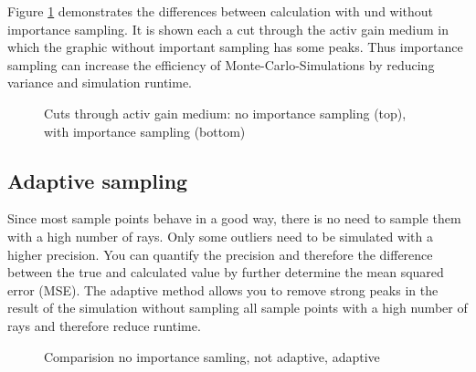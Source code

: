 Figure \ref{graphic:importance} demonstrates
the differences between calculation with und without
importance sampling. It is shown each a cut through the activ 
gain medium in which the graphic without important
sampling has some peaks. Thus importance 
sampling can increase the efficiency of Monte-Carlo-Simulations 
by reducing variance and simulation runtime. 
\begin{figure}
  \centerline
  {}
  \caption{Cuts through activ gain medium: no importance sampling (top), with importance sampling (bottom)}
  \label{graphic:importance}
\end{figure}

\subsection{Adaptive sampling}
Since most sample points behave in a good way, there is no need
to sample them with a high number of rays. Only some outliers need to
be simulated with a higher precision. You can quantify the precision
and therefore the difference between the true and calculated value by
further determine the mean squared error (MSE).
The adaptive method allows you to remove strong peaks in the result
of the simulation without sampling all sample points with
a high number of rays and therefore reduce runtime.
\begin{figure}
  \centerline{
    }
  \caption{Comparision no importance samling, not adaptive, adaptive}
  \label{plot:adaptive}
\end{figure}

